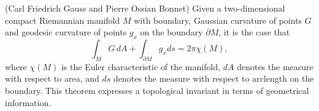 \documentclass[12pt]{article}
\begin{document}
(Carl Friedrich Gauss and Pierre Ossian Bonnet) Given a two-dimensional compact Riemannian manifold $M$ with boundary, 
Gaussian curvature of points $G$ and geodesic curvature of points $g_x$ on the boundary $\partial M$, it is the 
case that 
\[
\int_M G \, dA + \int_{\partial M}g_x ds = 2\pi\chi(M),
\] 
where $\chi(M)$ is the Euler characteristic of the manifold, $dA$ denotes the measure with respect to area, and $ds$ denotes the measure with respect to arclength on the boundary.  This theorem expresses a topological invariant in
terms of geometrical information.
\end{document}
